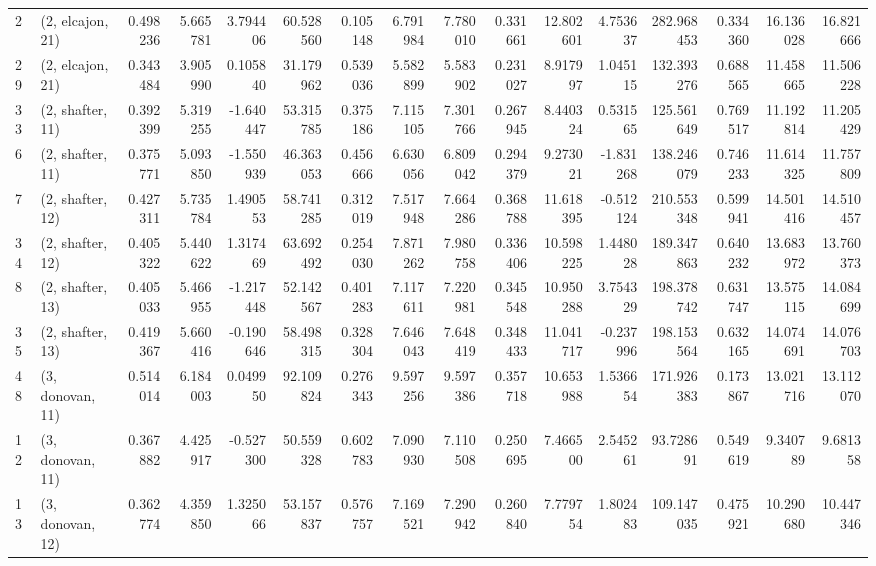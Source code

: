 \begin{tabular}{llrrrrrrrrrrrrrr}
2  &  (2, elcajon, 21) &   0.498236 &   5.665781 &  3.794406 &   60.528560 &  0.105148 &   6.791984 &   7.780010 &  0.331661 &  12.802601 &   4.753637 &  282.968453 &  0.334360 &  16.136028 &  16.821666 \\
29 &  (2, elcajon, 21) &   0.343484 &   3.905990 &  0.105840 &   31.179962 &  0.539036 &   5.582899 &   5.583902 &  0.231027 &   8.917997 &   1.045115 &  132.393276 &  0.688565 &  11.458665 &  11.506228 \\
33 &  (2, shafter, 11) &   0.392399 &   5.319255 & -1.640447 &   53.315785 &  0.375186 &   7.115105 &   7.301766 &  0.267945 &   8.440324 &   0.531565 &  125.561649 &  0.769517 &  11.192814 &  11.205429 \\
6  &  (2, shafter, 11) &   0.375771 &   5.093850 & -1.550939 &   46.363053 &  0.456666 &   6.630056 &   6.809042 &  0.294379 &   9.273021 &  -1.831268 &  138.246079 &  0.746233 &  11.614325 &  11.757809 \\
7  &  (2, shafter, 12) &   0.427311 &   5.735784 &  1.490553 &   58.741285 &  0.312019 &   7.517948 &   7.664286 &  0.368788 &  11.618395 &  -0.512124 &  210.553348 &  0.599941 &  14.501416 &  14.510457 \\
34 &  (2, shafter, 12) &   0.405322 &   5.440622 &  1.317469 &   63.692492 &  0.254030 &   7.871262 &   7.980758 &  0.336406 &  10.598225 &   1.448028 &  189.347863 &  0.640232 &  13.683972 &  13.760373 \\
8  &  (2, shafter, 13) &   0.405033 &   5.466955 & -1.217448 &   52.142567 &  0.401283 &   7.117611 &   7.220981 &  0.345548 &  10.950288 &   3.754329 &  198.378742 &  0.631747 &  13.575115 &  14.084699 \\
35 &  (2, shafter, 13) &   0.419367 &   5.660416 & -0.190646 &   58.498315 &  0.328304 &   7.646043 &   7.648419 &  0.348433 &  11.041717 &  -0.237996 &  198.153564 &  0.632165 &  14.074691 &  14.076703 \\
48 &  (3, donovan, 11) &   0.514014 &   6.184003 &  0.049950 &   92.109824 &  0.276343 &   9.597256 &   9.597386 &  0.357718 &  10.653988 &   1.536654 &  171.926383 &  0.173867 &  13.021716 &  13.112070 \\
12 &  (3, donovan, 11) &   0.367882 &   4.425917 & -0.527300 &   50.559328 &  0.602783 &   7.090930 &   7.110508 &  0.250695 &   7.466500 &   2.545261 &   93.728691 &  0.549619 &   9.340789 &   9.681358 \\
13 &  (3, donovan, 12) &   0.362774 &   4.359850 &  1.325066 &   53.157837 &  0.576757 &   7.169521 &   7.290942 &  0.260840 &   7.779754 &   1.802483 &  109.147035 &  0.475921 &  10.290680 &  10.447346 \\

\end{tabular}
